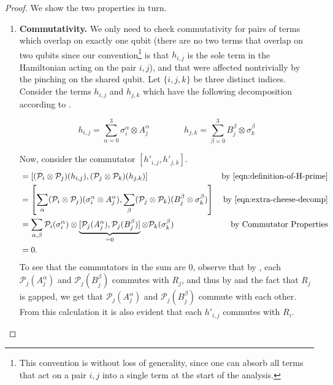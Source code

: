 \documentclass[11pt]{article}
\theoremstyle{plain}
\renewcommand{\cP}{\mathcal{P}}
\begin{document}
\begin{proof}

We show the two properties in turn.
\begin{enumerate}
    \item \textbf{Commutativity.} We only need to check commutativity for pairs of terms which overlap on exactly one qubit (there are no two terms that overlap on two qubits since our convention\footnote{This convention is without loss of generality, since one can absorb all terms that act on a pair $i,j$ into a single term at the start of the analysis.} is that $h_{i,j}$ is the sole term in the Hamiltonian acting on the pair $i,j$), and that were affected nontrivially by the pinching on the shared qubit. Let $\{i, j, k\}$ be three distinct indices. Consider the terms $h_{i,j}$ and $h_{j,k}$ which have the following decomposition according to .

    \begin{equation}\label{eqn:extra-cheese-decomp}
        h_{i,j} = \sum\limits_{\alpha = 0}^3 \sigma^\alpha_i \otimes A_j^\alpha \quad\quad\quad\quad h_{j,k} = \sum\limits_{\beta = 0}^3 B_j^\beta \otimes \sigma^\beta_k
    \end{equation}
    
Now, consider the commutator $[h'_{i,j}, h'_{j,k}]$.
\begin{align*}
    [h'_{i,j}, h'_{j,k}] &= [ (\cP_i \otimes \cP_j)(h_{i,j}), (\cP_j \otimes \cP_k)(h_{j,k}) ] & \text{by \Cref{eqn:definition-of-H-prime}}\\
    &= \left[ \sum_{\alpha} (\cP_i \otimes \cP_j)(\sigma^\alpha_i \otimes A_j^\alpha), \sum_{\beta} (\cP_j \otimes \cP_k)(B_j^\beta \otimes \sigma^\beta_k) \right ] & \text{by \Cref{eqn:extra-cheese-decomp}}\\
    &= \sum_{\alpha,\beta} \cP_i(\sigma_i^\alpha) \otimes \underbrace{[\cP_j(A^\alpha_j), \cP_j(B^\beta_j)]}_{=0} \otimes \cP_k(\sigma_k^\beta) & \text{by Commutator Properties}\\
    &= 0.
\end{align*}
To see that the commutators in the sum are $0$, observe that by , each $\cP_j(A_j^\alpha)$ and $\cP_j(B_j^\beta)$ commutes with $R_j$, and thus by  and the fact that $R_j$ is gapped, we get that $\cP_j(A_j^\alpha)$ and $\cP_j(B_j^\beta)$ commute with each other. From this calculation it is also evident that each $h'_{i,j}$ commutes with $R_i$. 


\end{enumerate}
\end{proof}
\end{document}
